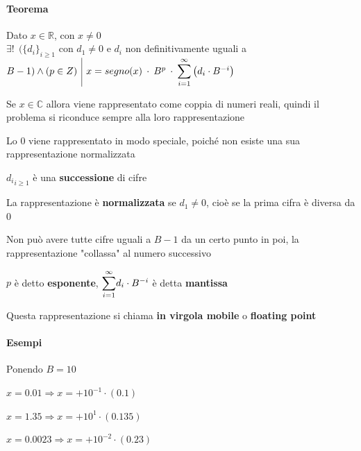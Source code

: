 \documentclass[10pt]{book}
\begin{document}
\paragraph{Teorema} Dato $x \in \mathbb{R}$, con $x \neq 0$\\$\exists!\:\:(\{d_i\}_{i \geq 1}$ con $d_1 \neq 0$ e $d_i$ non definitivamente uguali a $B - 1) \wedge (p \in Z) \:\:\vline\:\: x = segno(x)\:\cdot\:B^p\:\cdot\:\mathlarger{\sum_{i=1}^\infty}\left( d_i \cdot B^{-i}\right)$
\begin{list}{}{Considerazioni}
	\item Se $x \in \mathbb{C}$ allora viene rappresentato come coppia di numeri reali, quindi il problema si riconduce sempre alla loro rappresentazione
	\item Lo $0$ viene rappresentato in modo speciale, poiché non esiste una sua rappresentazione normalizzata
	\item ${d_i}_{i \geq 1}$ è una \textbf{successione} di cifre
	\item La rappresentazione è \textbf{normalizzata} se $d_1 \neq 0$, cioè se la prima cifra è diversa da 0
	\item Non può avere tutte cifre uguali a $B-1$ da un certo punto in poi, la rappresentazione "collassa" al numero successivo
	\item $p$ è detto \textbf{esponente}, $\mathlarger{\sum_{i=1}^\infty} d_i \cdot B^{-i}$ è detta \textbf{mantissa}
	\item Questa rappresentazione si chiama \textbf{in virgola mobile} o \textbf{floating point}
\end{list}
\begin{center}
\end{center} %
\pagebreak
\paragraph{Esempi} Ponendo $B = 10$
\begin{list}{}{}
	\item $x = 0.01 \Rightarrow x = +10^{-1}\cdot(0.1)$
	\item $x = 1.35 \Rightarrow x = +10^1\cdot(0.135)$
	\item $x = 0.0023 \Rightarrow x = +10^{-2}\cdot(0.23)$
\end{list}
\end{document}
